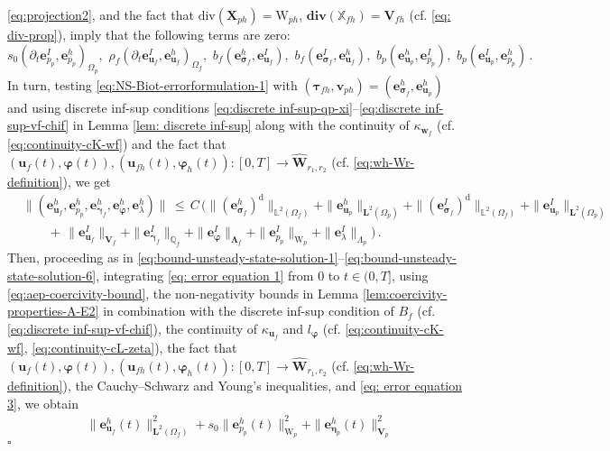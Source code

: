 \documentclass[11pt]{article}
\numberwithin{equation}{section}
\newcommand{\ds}{\displaystyle}
\newcommand{\bgamma}{{\boldsymbol\gamma}}
\newcommand{\bLambda}{{\boldsymbol\Lambda}}
\newcommand{\bbeta}{{\boldsymbol\eta}}
\newcommand{\bsi}{{\boldsymbol\sigma}}
\newcommand{\bvarphi}{{\boldsymbol\varphi}}
\newcommand{\btau}{{\boldsymbol\tau}}
\newcommand{\bv}{{\mathbf{v}}}
\newcommand{\bw}{{\mathbf{w}}}
\newcommand{\bu}{\mathbf{u}}
\newcommand{\be}{{\mathbf{e}}}
\newcommand{\0}{{\mathbf{0}}}
\def\bX{\mathbf{X}}
\def\bV{\mathbf{V}}
\def\bW{\mathbf{W}}
\newcommand{\bL}{\mathbf{L}}
\newcommand\bbQ{\mathbb{Q}}
\newcommand\bbX{\mathbb{X}}
\newcommand\bbL{\mathbb{L}}
\def\W{\mathrm{W}}
\def\rd{\mathrm{d}}
\def\bdiv{\mathbf{div}}
\def\div{\mathrm{div}}
\def\wh{\widehat}
\newenvironment{proof}{\noindent{\it Proof.}}{\hfill$\square$}
\numberwithin{equation}{section}
\begin{document}
\begin{proof}
\eqref{eq:projection2}, and the fact that 
$\div(\bX_{ph})=\W_{ph}$,
$\bdiv(\bbX_{fh}) = \bV_{fh}$ (cf. \eqref{eq: div-prop}), 
imply that the following terms are zero:
\begin{equation*}
s_0 (\partial_t\be_{p_p}^I,\be_{p_p}^h)_{\Omega_p}, \,\, \rho_f (\partial_t\be_{\bu_f}^I,\be_{\bu_f}^h)_{\Omega_f}, \,\,  b_f(\be_{\bsi_f}^h,\be_{\bu_f}^I), \,\, b_f(\be_{\bsi_f}^I,\be_{\bu_f}^h),\,\,
b_p(\be_{\bu_p}^h,\be_{p_p}^I), \,\, b_p(\be_{\bu_p}^I,\be_{p_p}^h)\,.
\end{equation*}
%
In turn, testing \eqref{eq:NS-Biot-errorformulation-1} with $(\btau_{fh}, \bv_{ph}) =(\be_{\bsi_f}^h, \be_{\bu_p}^h)$ and using discrete inf-sup conditions \eqref{eq:discrete inf-sup-qp-xi}--\eqref{eq:discrete inf-sup-vf-chif} in Lemma \ref{lem: discrete inf-sup} along with the continuity of $\kappa_{\bw_f}$ (cf. \eqref{eq:continuity-cK-wf}) and the fact that $(\bu_f(t),\bvarphi(t)),(\bu_{fh}(t),\bvarphi_{h}(t)):[0,T]\to \wh{\bW}_{r_1,r_2}$ (cf. \eqref{eq:wh-Wr-definition}), we get
\begin{align}
&\|(\be_{\bu_{f}}^h, \be_{p_{p}}^h, \be_{\bgamma_{f}}^h, \be_{\bvarphi}^h, \be_{\lambda}^h)\|
\,\leq\, C\,\Big( \|(\be_{\bsi_f}^h)^\rd\|_{\bbL^2(\Omega_f)} + \|\be_{\bu_p}^h\|_{\bL^2(\Omega_p)} +  \|(\be_{\bsi_f}^I)^\rd\|_{\bbL^2(\Omega_f)} + \|\be_{\bu_p}^I\|_{\bL^2(\Omega_p)}\nonumber \\
& \qquad  +\, \|\be_{\bu_f}^I\|_{\bV_f} + \|\be_{\bgamma_f}^I\|_{\bbQ_f} + \|\be_{\bvarphi}^I\|_{\bLambda_f} + \|\be_{p_p}^I\|_{\W_p} + \|\be_{\lambda}^I\|_{\Lambda_p} \Big)\,.
\label{eq: error equation 3}
\end{align}	
Then, proceeding as in \eqref{eq:bound-unsteady-state-solution-1}--\eqref{eq:bound-unsteady-state-solution-6}, integrating \eqref{eq: error equation 1} from $0$ to $t\in (0,T]$, using \eqref{eq:aep-coercivity-bound}, the non-negativity bounds in Lemma \ref{lem:coercivity-properties-A-E2} in combination with the discrete inf-sup condition of $B_f$ (cf. \eqref{eq:discrete inf-sup-vf-chif}), the continuity of $\kappa_{\bu_f}$ and $l_{\bvarphi}$ (cf. \eqref{eq:continuity-cK-wf}, \eqref{eq:continuity-cL-zeta}), the fact that $(\bu_f(t),\bvarphi(t)),(\bu_{fh}(t),\bvarphi_{h}(t)):[0,T]\to \wh{\bW}_{r_1,r_2}$ (cf. \eqref{eq:wh-Wr-definition}), the Cauchy--Schwarz and Young's inequalities, and \eqref{eq: error equation 3}, we obtain
%
\begin{align*}%
&\ds \|\be_{\bu_f}^h(t)\|^2_{\bL^2(\Omega_f)} 
+ s_0 \|\be_{p_p}^h(t)\|^2_{\W_p} 
+ \|\be_{\bbeta_p}^h(t)\|^2_{\bV_p} 

\end{align*}
\end{proof}
\end{document}
